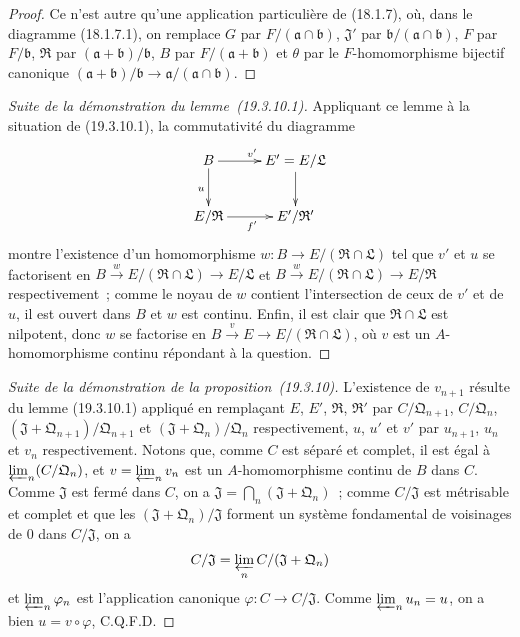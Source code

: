 \begin{proof}
Ce n'est autre qu'une application particulière de (18.1.7), où, dans le
diagramme (18.1.7.1), on remplace $G$ par
$F/(\mathfrak a\cap\mathfrak b)$, $\mathfrak J'$ par
$\mathfrak b/(\mathfrak a\cap\mathfrak b)$, $F$ par
$F/\mathfrak b$, $\mathfrak R$ par
$(\mathfrak a+\mathfrak b)/\mathfrak b$, $B$ par
$F/(\mathfrak a+\mathfrak b)$ et $\theta$ par le $F$-homomorphisme
bijectif canonique
$(\mathfrak a+\mathfrak b)/\mathfrak b\to
\mathfrak a/(\mathfrak a\cap\mathfrak b)$.
\end{proof}


\begin{proof}[Suite de la démonstration du lemme~{\rm(19.3.10.1)}]
Appliquant ce lemme à la situation de (19.3.10.1), la commutativité du
diagramme
\[
\xymatrix{
  B \ar[r]^{v'} \ar[d]_u & E'=E/\mathfrak L \ar[d] \\
  E/\mathfrak R \ar[r]_{f'} & E'/\mathfrak R'
}
\]
montre l'existence d'un homomorphisme
$w:B\to E/(\mathfrak R\cap\mathfrak L)$ tel que $v'$ et $u$ se
factorisent en
$B\xrightarrow{w}E/(\mathfrak R\cap\mathfrak L)\to E/\mathfrak L$
et
$B\xrightarrow{w}E/(\mathfrak R\cap\mathfrak L)\to E/\mathfrak R$
respectivement~; comme le noyau de $w$ contient l'intersection de ceux de
$v'$ et de $u$, il est ouvert dans $B$ et $w$ est continu. Enfin, il est clair
que $\mathfrak R\cap\mathfrak L$ est nilpotent, donc $w$ se factorise en
$B\xrightarrow{v}E\to E/(\mathfrak R\cap\mathfrak L)$, où $v$ est
un $A$-homomorphisme continu répondant à la question.
\end{proof}

\begin{proof}[Suite de la démonstration de la proposition~{\rm(19.3.10)}]
L'existence de $v_{n+1}$ résulte du lemme (19.3.10.1) appliqué en remplaçant
$E$, $E'$, $\mathfrak R$, $\mathfrak R'$ par
$C/\mathfrak Q_{n+1}$, $C/\mathfrak Q_n$,
$(\mathfrak J+\mathfrak Q_{n+1})/\mathfrak Q_{n+1}$ et
$(\mathfrak J+\mathfrak Q_n)/\mathfrak Q_n$ respectivement, $u$, $u'$
et $v'$ par $u_{n+1}$, $u_n$ et $v_n$ respectivement. Notons que, comme $C$
est séparé et complet, il est égal à $\varprojlim_n(C/\mathfrak Q_n)$, et
$v=\varprojlim_n v_n$ est un $A$-homomorphisme continu de $B$ dans $C$.
Comme $\mathfrak J$ est fermé dans $C$, on a
$\mathfrak J=\bigcap_n(\mathfrak J+\mathfrak Q_n)$~; comme
$C/\mathfrak J$ est métrisable et complet et que les
$(\mathfrak J+\mathfrak Q_n)/\mathfrak J$ forment un système fondamental
de voisinages de $0$ dans $C/\mathfrak J$, on a
\[
  C/\mathfrak J=\varprojlim_n C/(\mathfrak J+\mathfrak Q_n)
\]
et $\varprojlim_n\varphi_n$ est l'application canonique
$\varphi:C\to C/\mathfrak J$. Comme $\varprojlim_n u_n=u$, on a bien
$u=v\circ\varphi$, C.Q.F.D.
\end{proof}

